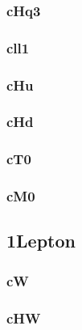 \documentclass[landscape, 12pt,letterpaper]{article}
\begin{document}
\newpage

\subsubsection{cHq3}


\newpage

\subsubsection{cll1}


\newpage

\subsubsection{cHu}


\newpage

\subsubsection{cHd}


\newpage

\subsubsection{cT0}


\newpage

\subsubsection{cM0}


\newpage

\newpage

\subsection{1Lepton }
\subsubsection{cW}


\newpage

\subsubsection{cHW}

\end{document}

